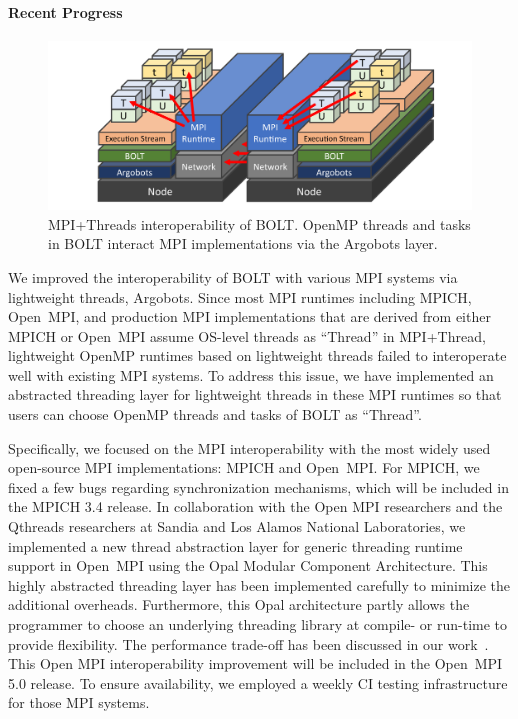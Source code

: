 \paragraph{Recent Progress}

\begin{figure}[t]
  \centering
  \includegraphics[width=0.9\columnwidth]{projects/2.3.2-Tools/2.3.2.11-SOLLVE/SOLLVE-BOLT.pdf}

  \caption{\label{fig:sollve-bolt} MPI+Threads interoperability of
  BOLT.  OpenMP threads and tasks in BOLT interact MPI implementations
  via the Argobots layer.}
\end{figure}

We improved the interoperability of BOLT with various MPI systems via
lightweight threads, Argobots.  Since most MPI runtimes including
MPICH, Open~MPI, and production MPI implementations that are derived
from either MPICH or Open~MPI assume OS-level threads as ``Thread'' in
MPI+Thread, lightweight OpenMP runtimes based on lightweight threads
failed to interoperate well with existing MPI systems.  To address
this issue, we have implemented an abstracted threading layer for
lightweight threads in these MPI runtimes so that users can choose
OpenMP threads and tasks of BOLT as ``Thread''.

Specifically, we focused on the MPI interoperability with the most
widely used open-source MPI implementations: MPICH and Open~MPI.  For
MPICH, we fixed a few bugs regarding synchronization mechanisms, which
will be included in the MPICH 3.4 release.  In collaboration with the Open MPI
researchers and the Qthreads researchers at Sandia and Los Alamos
National Laboratories, we implemented a new thread abstraction layer
for generic threading runtime support in Open~MPI using the Opal
Modular Component Architecture.  This highly abstracted threading
layer has been implemented carefully to minimize the additional
overheads.  Furthermore, this Opal architecture partly allows the
programmer to choose an underlying threading library at compile- or
run-time to provide flexibility.  The performance trade-off has
been discussed in our work~\cite{ExaMPI20MCAThreads}.  This Open MPI
interoperability improvement will be included in the Open~MPI 5.0
release. To ensure availability, we employed a weekly CI testing
infrastructure for those MPI systems.

